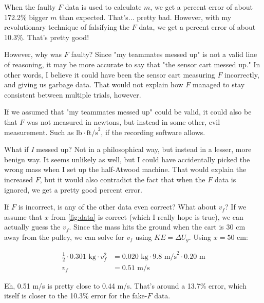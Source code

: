 \documentclass[twocolumn]{article}
\begin{document}
When the faulty $F$ data is used to calculate $m$, we get a percent error of
about 172.2\% bigger $m$ than expected. That's... pretty bad. However, with my
revolutionary technique of falsifying the $F$ data, we get a percent error of
about 10.3\%. That's pretty good!

However, why was $F$ faulty? Since "my teammates messed up" is not a valid
line of reasoning, it may be more accurate to say that "the sensor cart messed
up." In other words, I believe it could have been the sensor cart measuring $F$
incorrectly, and giving us garbage data. That would not explain how $F$ managed
to stay consistent between multiple trials, however.

If we assumed that "my teammates messed up" could be valid, it could also be
that $F$ was not measured in newtons, but instead in some other, evil
measurement. Such as $\text{lb} \cdot \text{ft/s}^2$, if the recording software
allows.

What if \emph{I} messed up? Not in a philosophical way, but instead in a lesser,
more benign way.  It seems unlikely as well, but I could have accidentally
picked the wrong mass when I set up the half-Atwood machine. That would explain
the increased $F$, but it would also contradict the fact that when the $F$ data
is ignored, we get a pretty good percent error.

If $F$ is incorrect, is any of the other data even correct? What about $v_f$? If
we assume that $x$ from \ref{fig:data} is correct (which I really hope is true),
we can actually guess the $v_f$. Since the mass hits the ground when the cart is
30 cm away from the pulley, we can solve for $v_f$ using $KE = \Delta U_g$.
Using $x = 50$ cm:

\begin{align*}
    \frac{1}{2} \cdot 0.301 \text{ kg} \cdot v_f^2 &= 0.020 \text{ kg} \cdot 9.8 \text{ m/s}^2 \cdot 0.20 \text{ m} \\
    v_f &= 0.51 \text{ m/s}
\end{align*}

Eh, 0.51 m/s is pretty close to 0.44 m/s. That's around a 13.7\% error, which
itself is closer to the 10.3\% error for the fake-$F$ data.
\end{document}
